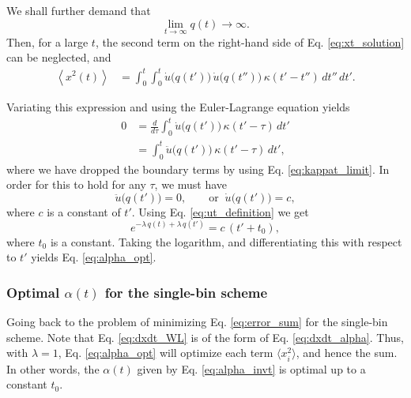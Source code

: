 \documentclass[reprint]{revtex4-1}
\begin{document}
We shall further demand that
%
\begin{equation}
  \lim_{t \to \infty} q(t) \to \infty.
  \label{eq:qt_limit}
\end{equation}
%
Then, for a large $t$,
the second term on the right-hand side
of Eq. \eqref{eq:xt_solution} can be neglected, and
%
\begin{align}
\left\langle x^2(t) \right\rangle
&=
\int_0^t \int_0^t
  \dot u\bigl( q(t') \bigr) \,
  \dot u\bigl( q(t'') \bigr) \,
  \kappa(t' - t'') \, dt'' \, dt'.
\label{eq:x2t_average_asym}
\end{align}



Variating this expression and
using the Euler-Lagrange equation yields
$$
\begin{aligned}
0
&=
\frac{d}{d\tau} \int_0^t
  \dot u\bigl( q(t') \bigr) \, \kappa(t' - \tau) \, dt'
\\
&= \int_0^t
  \ddot u\bigl( q(t') \bigr) \, \kappa(t' - \tau) \, dt',
\end{aligned}
$$
where we have dropped the boundary terms
by using Eq. \eqref{eq:kappat_limit}.
%
%
In order for this to hold for any $\tau$,
we must have
%
\begin{equation}
\ddot u\bigl( q(t') \bigr) = 0,
\qquad
\mathrm{or}
\;\;
\dot u\bigl( q(t') \bigr) = c,
\label{eq:ddu_eq_0}
\end{equation}
%
where $c$ is a constant of $t'$.
%
Using Eq. \eqref{eq:ut_definition}
we get
$$
e^{-\lambda \, q(t) + \lambda \, q(t')}
=
c \, (t' + t_0),
$$
where $t_0$ is a constant.
%
Taking the logarithm, and differentiating this with respect to $t'$
yields Eq. \eqref{eq:alpha_opt}.



\subsubsection{Optimal $\alpha(t)$ for the single-bin scheme}



Going back to the problem of
minimizing Eq. \eqref{eq:error_sum}
for the single-bin scheme.
%
Note that Eq. \eqref{eq:dxdt_WL}
is of the form of Eq. \eqref{eq:dxdt_alpha}.
%
Thus, with $\lambda = 1$,
Eq. \eqref{eq:alpha_opt}
will optimize each term $\langle x_i^2 \rangle$,
and hence the sum.
%
In other words, the $\alpha(t)$ given by
Eq. \eqref{eq:alpha_invt} is optimal
up to a constant $t_0$.
\end{document}
